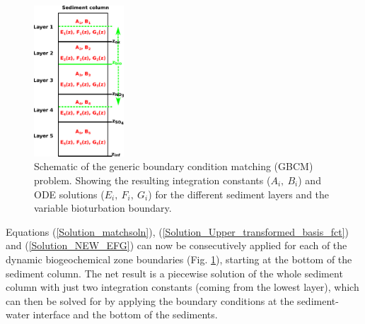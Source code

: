 \documentclass[gmd, manuscript]{copernicus}
\begin{document}
\begin{figure}[htbp]
\begin{center}
	\includegraphics[width=0.3\textwidth]{figures/Boundary_Matching_zbio.pdf}
	\caption{Schematic of the generic boundary condition matching (GBCM) problem. Showing the resulting integration constants ($A_i,\ B_i$) and ODE solutions ($E_i,\ F_i,\ G_i$) for the different sediment layers and the variable 
	bioturbation boundary.}
	\label{fig:Boundary_matching_algo}
	\end{center}
\end{figure}

Equations (\ref{Solution_matchsoln}), (\ref{Solution_Upper_transformed_basis_fct}) and (\ref{Solution_NEW_EFG}) can now be consecutively applied for each of the dynamic biogeochemical zone boundaries (Fig. \ref{fig:Boundary_matching_algo}), 
starting at the bottom of the sediment column. The net result is a piecewise solution of the whole sediment column with just two integration constants (coming from the lowest layer), which can then be solved for by applying the boundary 
conditions at the sediment-water interface and the bottom of the sediments. 
\end{document}
